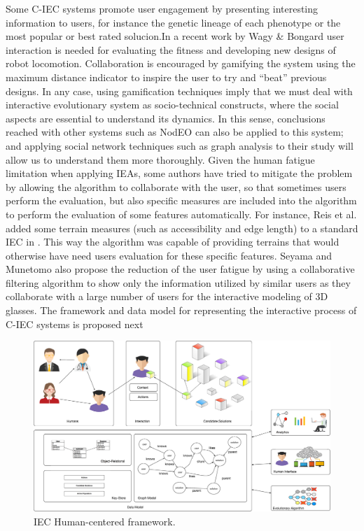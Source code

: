 Some C-IEC systems promote user engagement by presenting interesting information to 
users, for instance the genetic lineage of each phenotype or the most popular or 
best rated solucion\cite{picbreeder,forms}.In a recent work by 
Wagy \& Bongard \cite{wagy2014collective} user interaction 
is needed for evaluating the fitness and developing
new designs of robot locomotion. Collaboration is encouraged by gamifying the system 
using the maximum distance indicator to inspire the user to try and ``beat'' previous designs. 
In any case, using gamification techniques imply that we must deal with interactive evolutionary
system as socio-technical constructs, where the social aspects are
essential to understand its dynamics. In this sense, conclusions
reached with other systems such as NodEO \cite{DBLP:conf/gecco/MereloCGCRV16}
can also be applied to this system; and applying social 
network techniques such as graph analysis
to their study will allow us to understand them more thoroughly. 
Given the human fatigue limitation when applying IEAs, some authors 
have tried to mitigate the problem by allowing the algorithm to 
collaborate with the user, so that sometimes 
users perform the evaluation,  but also specific measures are included 
into the algorithm to perform the
evaluation of some features automatically. For instance, 
Reis et al. added some terrain measures (such as accessibility and edge length) 
to a standard  IEC in \cite{DBLP:journals/soco/FradeVC12}. 
This way the algorithm was capable of providing  terrains that would otherwise have need
users evaluation for these specific features. Seyama and Munetomo \cite{seyama2016development}
also propose the reduction of the user fatigue by using 
a collaborative filtering algorithm to show only the information utilized by similar users as 
they collaborate with a large number of users for the interactive modeling of 3D glasses. 
The framework and data model for 
representing the interactive process of C-IEC systems is proposed next

\begin{figure}[!t]
    \centering
        \includegraphics[width=5.5in]{img/framework.eps}
    \caption{IEC Human-centered framework.}
    \label{fig:hc_framework}
\end{figure}

